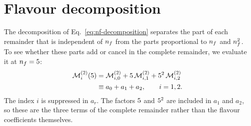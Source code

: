 \section{Flavour decomposition}
\label{app:flavour}

The decomposition of Eq.~\eqref{eq:nf-decomposition} separates the part of
each remainder that is independent of $n_f$ from the parts proportional to
$n_f$ and $n_f^2$. To see whether these parts add or cancel in the complete
remainder, we evaluate it at $n_f=5$:
\begin{align}
 \mathcal{M}^{(2)}_{i}(5)
 &=\mathcal{M}^{(2)}_{i,0}
   +5\,\mathcal{M}^{(2)}_{i,1}
   +5^2\,\mathcal{M}^{(2)}_{i,2}
 \nonumber\\
 &\equiv a_0+a_1+a_2,
 \qquad i=1,2.
 \label{eq:nf5-sum}
\end{align}
The index $i$ is suppressed in $a_r$. The factors $5$ and
$5^2$ are included in $a_1$ and $a_2$, so these are the three terms
of the complete remainder rather than the flavour coefficients themselves.

